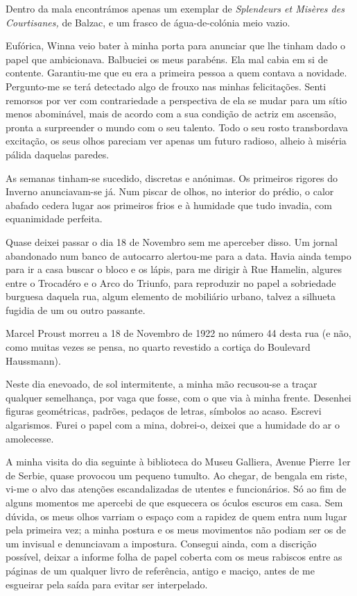 Dentro da mala encontrámos apenas um exemplar de \emph{Splendeurs et
Misères des Courtisanes, }de Balzac, e um frasco de água-de-colónia meio
vazio.

Eufórica, Winna veio bater à minha porta para anunciar que lhe tinham
dado o papel que ambicionava. Balbuciei os meus parabéns. Ela mal cabia
em si de contente. Garantiu-me que eu era a primeira pessoa a quem contava a novidade. Pergunto-me
se terá detectado algo de frouxo nas minhas felicitações. Senti remorsos
por ver com contrariedade a perspectiva de ela se mudar para um sítio
menos abominável, mais de acordo com a sua condição de actriz em
ascensão, pronta a surpreender o mundo com o seu talento. Todo o seu
rosto transbordava excitação, os seus olhos pareciam ver apenas um
futuro radioso, alheio à miséria pálida daquelas paredes.

As semanas tinham-se sucedido, discretas e anónimas. Os primeiros
rigores do Inverno anunciavam-se já. Num piscar de olhos, no interior do
prédio, o calor abafado cedera lugar aos primeiros frios e à humidade
que tudo invadia, com equanimidade perfeita.

Quase deixei passar o dia 18 de Novembro sem me aperceber disso. Um
jornal abandonado num banco de autocarro alertou-me para a data. Havia
ainda tempo para ir a casa buscar o bloco e os lápis, para me dirigir
à Rue Hamelin, algures entre o Trocadéro e o Arco do Triunfo, para
reproduzir no papel a sobriedade burguesa daquela rua, algum elemento de
mobiliário urbano, talvez a silhueta fugidia de um ou outro passante.

Marcel Proust morreu a 18 de Novembro de 1922 no número 44 desta rua (e
não, como muitas vezes se pensa,
no quarto revestido a cortiça do Boulevard Haussmann).

Neste dia enevoado, de sol intermitente, a minha mão recusou-se a traçar
qualquer semelhança, por vaga que fosse, com o que via à minha frente.
Desenhei figuras geométricas, padrões, pedaços de letras, símbolos ao
acaso. Escrevi algarismos. Furei o papel com a mina, dobrei-o, deixei
que a humidade do ar o amolecesse.

A minha visita do dia seguinte à biblioteca do Museu Galliera, Avenue
Pierre 1er de Serbie, quase provocou um pequeno tumulto. Ao chegar, de
bengala em riste, vi-me o alvo das atenções escandalizadas de utentes e
funcionários. Só ao fim de alguns momentos me apercebi de que esquecera
os óculos escuros em casa. Sem dúvida, os meus olhos varriam o espaço
com a rapidez de quem entra num lugar pela primeira vez; a minha postura
e os meus movimentos não podiam ser os de um invisual e denunciavam a
impostura. Consegui ainda, com a discrição possível, deixar a informe
folha de papel coberta com os meus rabiscos entre as páginas de um
qualquer livro de referência, antigo e maciço, antes de me esgueirar
pela saída para evitar ser interpelado.

